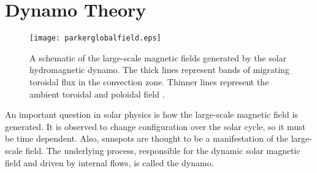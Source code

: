 \section{Dynamo Theory}

\begin{figure}[!t]
\centerline{\texttt{[image: parkerglobalfield.eps]}}
\caption[A schematic of magnetic fields generated by the solar dynamo.]{A schematic of the large-scale magnetic fields generated by the solar hydromagnetic dynamo. The thick lines represent bands of migrating toroidal flux in the convection zone. Thinner lines represent the ambient toroidal and poloidal field \citep[from][]{Parker:1957}.}
\label{fig:parkerdynamo}
\end{figure}

An important question in solar physics is how the large-scale magnetic field is generated. It is observed to change configuration over the solar cycle, so it must be time dependent. Also, sunspots are thought to be a manifestation of the large-scale field. The underlying process, responsible for the dynamic solar magnetic field and driven by internal flows, is called the dynamo. 
 
